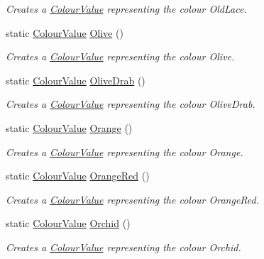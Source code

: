 \begin{DoxyCompactItemize}
\begin{DoxyCompactList}\small\item\em Creates a \hyperlink{classMezzanine_1_1ColourValue}{ColourValue} representing the colour OldLace. \item\end{DoxyCompactList}\item 
static \hyperlink{classMezzanine_1_1ColourValue}{ColourValue} \hyperlink{classMezzanine_1_1ColourValue_a52885c725d2474a6826164f8a8e11dba}{Olive} ()
\begin{DoxyCompactList}\small\item\em Creates a \hyperlink{classMezzanine_1_1ColourValue}{ColourValue} representing the colour Olive. \item\end{DoxyCompactList}\item 
static \hyperlink{classMezzanine_1_1ColourValue}{ColourValue} \hyperlink{classMezzanine_1_1ColourValue_a72ccb5b5e5610f8a78e4f7cff14143e4}{OliveDrab} ()
\begin{DoxyCompactList}\small\item\em Creates a \hyperlink{classMezzanine_1_1ColourValue}{ColourValue} representing the colour OliveDrab. \item\end{DoxyCompactList}\item 
static \hyperlink{classMezzanine_1_1ColourValue}{ColourValue} \hyperlink{classMezzanine_1_1ColourValue_a617ef1155a651c1325465239a44d3136}{Orange} ()
\begin{DoxyCompactList}\small\item\em Creates a \hyperlink{classMezzanine_1_1ColourValue}{ColourValue} representing the colour Orange. \item\end{DoxyCompactList}\item 
static \hyperlink{classMezzanine_1_1ColourValue}{ColourValue} \hyperlink{classMezzanine_1_1ColourValue_a5e616c1fe97489c844eeafd74f1296d6}{OrangeRed} ()
\begin{DoxyCompactList}\small\item\em Creates a \hyperlink{classMezzanine_1_1ColourValue}{ColourValue} representing the colour OrangeRed. \item\end{DoxyCompactList}\item 
static \hyperlink{classMezzanine_1_1ColourValue}{ColourValue} \hyperlink{classMezzanine_1_1ColourValue_a7e5ed523b0d68797c538d6266d580e0e}{Orchid} ()
\begin{DoxyCompactList}\small\item\em Creates a \hyperlink{classMezzanine_1_1ColourValue}{ColourValue} representing the colour Orchid. \item\end{DoxyCompactList}\item 

\end{DoxyCompactItemize}
